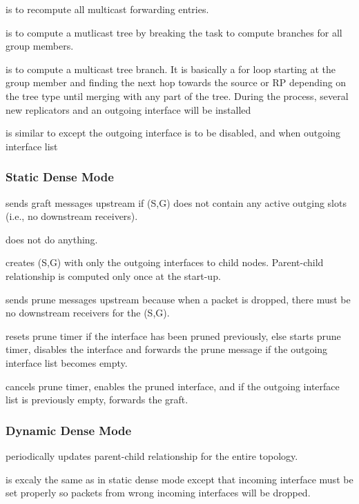  is to recompute all multicast forwarding entries.

 is to compute a mutlicast tree by breaking the task to compute branches for all group members.

 is to compute a multicast tree branch.  It is basically a for loop starting at the group member and finding the next hop towards the source or RP depending on the tree type until merging with any part of the tree. During the process, several new replicators and an outgoing interface will be installed 

 is similar to  except the outgoing interface is to be disabled, and when outgoing interface list 


\subsubsection{Static Dense Mode}
 sends graft messages upstream if (S,G) does not contain any active outging slots (i.e., no downstream receivers).

 does not do anything.

 creates (S,G) with only the outgoing interfaces to child nodes. Parent-child relationship is computed only once at the start-up.

 sends prune messages upstream because when a packet is dropped, there must be no downstream receivers for the (S,G).

 resets prune timer if the interface has been pruned previously, else starts prune timer, disables the interface and forwards the prune message if the outgoing interface list becomes empty.

 cancels prune timer, enables the pruned interface, and if the outgoing interface list is previously empty, forwards the graft.


\subsubsection{Dynamic Dense Mode}

 periodically updates parent-child relationship for the entire topology.

 is excaly the same as in static dense mode except that incoming interface must be set properly so packets from wrong incoming interfaces will be dropped.

